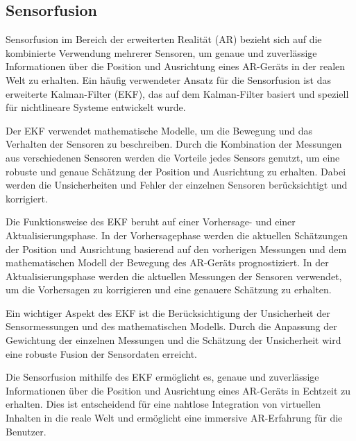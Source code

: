 \subsection{Sensorfusion}
Sensorfusion im Bereich der erweiterten Realität (AR) bezieht sich auf die
kombinierte Verwendung mehrerer Sensoren, um genaue und zuverlässige
Informationen über die Position und Ausrichtung eines AR-Geräts in der realen
Welt zu erhalten. Ein häufig verwendeter Ansatz für die Sensorfusion ist das
erweiterte Kalman-Filter (EKF), das auf dem Kalman-Filter basiert und speziell
für nichtlineare Systeme entwickelt wurde.

Der EKF verwendet mathematische Modelle, um die Bewegung und das Verhalten der
Sensoren zu beschreiben. Durch die Kombination der Messungen aus verschiedenen
Sensoren werden die Vorteile jedes Sensors genutzt, um eine robuste und genaue
Schätzung der Position und Ausrichtung zu erhalten. Dabei werden die
Unsicherheiten und Fehler der einzelnen Sensoren berücksichtigt und korrigiert.

Die Funktionsweise des EKF beruht auf einer Vorhersage- und einer
Aktualisierungsphase. In der Vorhersagephase werden die aktuellen Schätzungen
der Position und Ausrichtung basierend auf den vorherigen Messungen und dem
mathematischen Modell der Bewegung des AR-Geräts prognostiziert. In der
Aktualisierungsphase werden die aktuellen Messungen der Sensoren verwendet, um
die Vorhersagen zu korrigieren und eine genauere Schätzung zu erhalten.

Ein wichtiger Aspekt des EKF ist die Berücksichtigung der Unsicherheit der
Sensormessungen und des mathematischen Modells. Durch die Anpassung der
Gewichtung der einzelnen Messungen und die Schätzung der Unsicherheit wird eine
robuste Fusion der Sensordaten erreicht.

Die Sensorfusion mithilfe des EKF ermöglicht es, genaue und zuverlässige
Informationen über die Position und Ausrichtung eines AR-Geräts in Echtzeit zu
erhalten. Dies ist entscheidend für eine nahtlose Integration von virtuellen
Inhalten in die reale Welt und ermöglicht eine immersive AR-Erfahrung für die
Benutzer.


